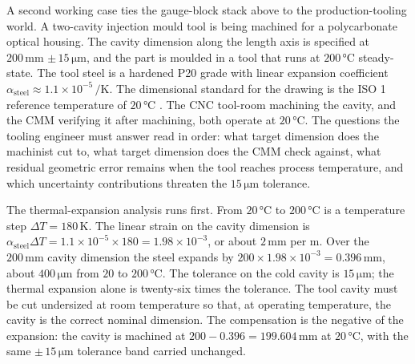 A second working case ties the gauge-block stack above to the
production-tooling world. A two-cavity injection mould tool is being
machined for a polycarbonate optical housing. The cavity dimension
along the length axis is specified at $200 \,\si{\milli\meter}$
$\pm\,15 \,\si{\micro\meter}$, and the part is moulded in a tool
that runs at $200 \,\si{\degreeCelsius}$ steady-state. The tool
steel is a hardened P20 grade with linear expansion coefficient
$\alpha_{\mathrm{steel}} \approx 1.1 \times 10^{-5} \,\si{\per
\kelvin}$. The dimensional standard for the drawing is the ISO 1
reference temperature of $20 \,\si{\degreeCelsius}$
\cite{std:iso-1-2022}. The CNC tool-room machining the cavity, and
the CMM verifying it after machining, both operate at $20 \,\si
{\degreeCelsius}$. The questions the tooling engineer must answer
read in order: what target dimension does the machinist cut to,
what target dimension does the CMM check against, what residual
geometric error remains when the tool reaches process temperature,
and which uncertainty contributions threaten the $15 \,\si{\micro
\meter}$ tolerance.

The thermal-expansion analysis runs first. From $20 \,\si
{\degreeCelsius}$ to $200 \,\si{\degreeCelsius}$ is a temperature
step $\Delta T = 180 \,\si{\kelvin}$. The linear strain on the
cavity dimension is $\alpha_{\mathrm{steel}} \Delta T = 1.1 \times
10^{-5} \times 180 = 1.98 \times 10^{-3}$, or about $2 \,\si
{\milli\meter}$ per $\si{\meter}$. Over the $200 \,\si{\milli\meter}$
cavity dimension the steel expands by $200 \times 1.98 \times
10^{-3} = 0.396 \,\si{\milli\meter}$, about $400 \,\si{\micro\meter}$
from $20$ to $200 \,\si{\degreeCelsius}$. The tolerance on the cold
cavity is $15 \,\si{\micro\meter}$; the thermal expansion alone is
twenty-six times the tolerance. The tool cavity must be cut
undersized at room temperature so that, at operating temperature,
the cavity is the correct nominal dimension. The compensation is
the negative of the expansion: the cavity is machined at
$200 - 0.396 = 199.604 \,\si{\milli\meter}$ at $20 \,\si
{\degreeCelsius}$, with the same $\pm\,15 \,\si{\micro\meter}$
tolerance band carried unchanged.

